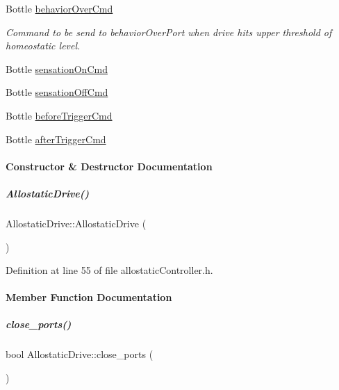 \begin{DoxyCompactItemize}
Bottle \hyperlink{group__allostaticController_a0e6d273bf648085493b00b9aae6c88b9}{behavior\+Over\+Cmd}
\begin{DoxyCompactList}\small\item\em Command to be send to behavior\+Over\+Port when drive hits upper threshold of homeostatic level. \end{DoxyCompactList}\item 
Bottle \hyperlink{group__allostaticController_a26f0b7c82d8ad12eaf4e3a68f4000302}{sensation\+On\+Cmd}
\item 
Bottle \hyperlink{group__allostaticController_a10d504bd4b07b96cac8bbb040bb5fd57}{sensation\+Off\+Cmd}
\item 
Bottle \hyperlink{group__allostaticController_a7605dcaf4074f476d6f743814f15c382}{before\+Trigger\+Cmd}
\item 
Bottle \hyperlink{group__allostaticController_aac6cbca31cb2568076e57aaabbfc2d2e}{after\+Trigger\+Cmd}
\end{DoxyCompactItemize}


\paragraph{Constructor \& Destructor Documentation}
\mbox{\label{group__allostaticController_aaa650f6d22aab98491d3a416a6f779fa}} 
\subparagraph{\texorpdfstring{Allostatic\+Drive()}{AllostaticDrive()}}
{\footnotesize\ttfamily Allostatic\+Drive\+::\+Allostatic\+Drive (\begin{DoxyParamCaption}{ }\end{DoxyParamCaption})\hspace{0.3cm}{\ttfamily [inline]}}



Definition at line 55 of file allostatic\+Controller.\+h.



\paragraph{Member Function Documentation}
\mbox{\label{group__allostaticController_a39a9ed70e712c005bb825ffcd1f47c26}} 
\subparagraph{\texorpdfstring{close\+\_\+ports()}{close\_ports()}}
{\footnotesize\ttfamily bool Allostatic\+Drive\+::close\+\_\+ports (\begin{DoxyParamCaption}{ }\end{DoxyParamCaption})}



